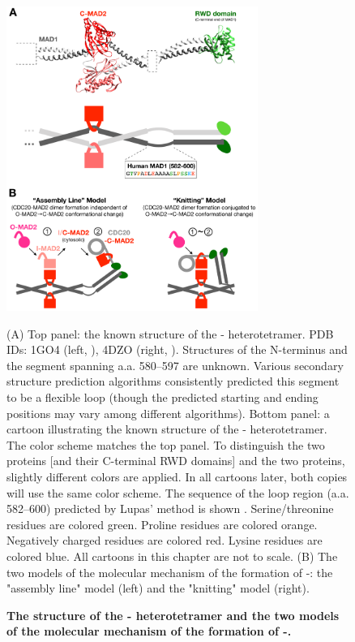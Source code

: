 \begin{figure}
    \centering
    \includegraphics[width=0.73\textwidth]{chapters/figures/MAD1C+KnittingModel.pdf}
    \caption{\textbf{The structure of the - heterotetramer and the two models of the molecular mechanism of the formation of -.}}
    \noindent\justifying (A) Top panel: the known structure of the - heterotetramer. PDB IDs: 1GO4 (left, \cite{Structure1GO4}), 4DZO (right, \cite{Structure4DZO}). Structures of the N-terminus and the segment spanning a.a. 580--597 are unknown. Various secondary structure prediction algorithms consistently predicted this segment to be a flexible loop (though the predicted starting and ending positions may vary among different algorithms). Bottom panel: a cartoon illustrating the known structure of the - heterotetramer. The color scheme matches the top panel. To distinguish the two  proteins [and their C-terminal RWD domains] and the two  proteins, slightly different colors are applied. In all cartoons later, both copies will use the same color scheme. The sequence of the loop region (a.a. 582--600) predicted by Lupas' method is shown \cite{LupasCOILS}. Serine/threonine residues are colored green. Proline residues are colored orange. Negatively charged residues are colored red. Lysine residues are colored blue. All cartoons in this chapter are not to scale. (B) The two models of the molecular mechanism of the formation of -: the "assembly line" model (left) and the "knitting" model (right).
    \label{MAD1C+KnittingModel}
\end{figure}

